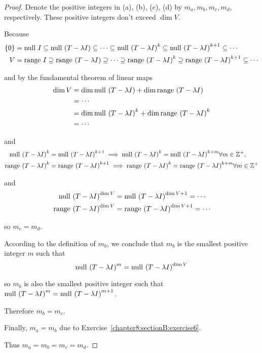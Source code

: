 \begin{proof}
    Denote the positive integers in (a), (b), (c), (d) by $m_{a}, m_{b}, m_{c}, m_{d}$, respectively. These positive integers don't exceed $\dim V$.

    Because
    \begin{align*}
        \{0\} & = \operatorname{null}\,{I} \subseteq \operatorname{null}\,{{(T - \lambda I)}} \subseteq \cdots \subseteq \operatorname{null}\,{{(T - \lambda I)}^{k}} \subseteq \operatorname{null}\,{{(T - \lambda I)}^{k+1}} \subseteq \cdots \\
        V     & = \operatorname{range}\,{I} \supseteq \operatorname{range}\,{{(T - \lambda I)}} \supseteq \cdots \supseteq \operatorname{range}\,{{(T - \lambda I)}^{k}} \supseteq \operatorname{range}\,{{(T - \lambda I)}^{k+1}} \subseteq \cdots
    \end{align*}

    and by the fundamental theorem of linear maps
    \begin{align*}
        \dim V & = \dim\operatorname{null}\,{(T - \lambda I)} + \dim\operatorname{range}\,{(T - \lambda I)}             \\
               & = \cdots                                                                 \\
               & = \dim\operatorname{null}\,{{(T - \lambda I)}^{k}} + \dim\operatorname{range}\,{{(T - \lambda I)}^{k}} \\
               & = \cdots
    \end{align*}

    and
    \begin{align*}
        \operatorname{null}\,{{(T - \lambda I)}^{k}} & = \operatorname{null}\,{{(T - \lambda I)}^{k+1}} \implies\operatorname{null}\,{{(T - \lambda I)}^{k}} = \operatorname{null}\,{{(T - \lambda I)}^{k+m}}\forall m\in\mathbb{Z}^{+}, \\
        \operatorname{range}\,{{(T - \lambda I)}^{k}}  & = \operatorname{range}\,{{(T - \lambda I)}^{k+1}} \implies\operatorname{range}\,{{(T - \lambda I)}^{k}} = \operatorname{range}\,{{(T - \lambda I)}^{k+m}}\forall m\in\mathbb{Z}^{+}
    \end{align*}

    and
    \begin{align*}
        \operatorname{null}\,{{(T - \lambda I)}^{\dim V}} & = \operatorname{null}\,{{(T - \lambda I)}^{\dim V+1}} = \cdots \\
        \operatorname{range}\,{{(T - \lambda I)}^{\dim V}}  & = \operatorname{range}\,{{(T - \lambda I)}^{\dim V+1}}  = \cdots
    \end{align*}

    so $m_{c} = m_{d}$.

    According to the definition of $m_{b}$, we conclude that $m_{b}$ is the smallest positive integer $m$ such that
    \[
        \operatorname{null}\,{{(T - \lambda I)}^{m}} = \operatorname{null}\,{{(T - \lambda I)}^{\dim V}}
    \]

    so $m_{b}$ is also the smallest positive integer such that $\operatorname{null}\,{{(T - \lambda I)}^{m}} = \operatorname{null}\,{{(T - \lambda I)}^{m+1}}$.

    Therefore $m_{b} = m_{c}$.

    Finally, $m_{a} = m_{b}$ due to Exercise~\ref{chapter8:sectionB:exercise6}.

    Thus $m_{a} = m_{b} = m_{c} = m_{d}$.
\end{proof}
\newpage

